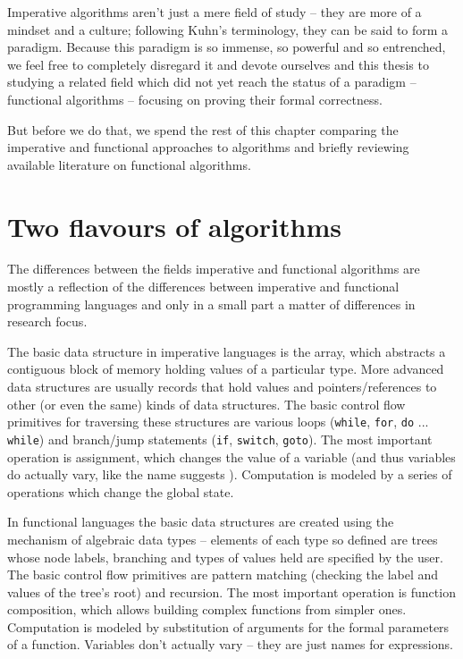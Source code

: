 \documentclass[declaration,mgr,english,shortabstract]{iithesis}
\newcommand{\m}[1]{\texttt{#1}}
\begin{document}
Imperative algorithms aren't just a mere field of study -- they are more of a mindset and a culture; following Kuhn's \cite{Kuhn} terminology, they can be said to form a paradigm. Because this paradigm is so immense, so powerful and so entrenched, we feel free to completely disregard it and devote ourselves and this thesis to studying a related field which did not yet reach the status of a paradigm -- functional algorithms -- focusing on proving their formal correctness.

But before we do that, we spend the rest of this chapter comparing the imperative and functional approaches to algorithms and briefly reviewing available literature on functional algorithms.

\section{Two flavours of algorithms} \label{ch1s2}

The differences between the fields imperative and functional algorithms are mostly a reflection of the differences between imperative and functional programming languages and only in a small part a matter of differences in research focus.

The basic data structure in imperative languages is the array, which abstracts a contiguous block of memory holding values of a particular type. More advanced data structures are usually records that hold values and pointers/references to other (or even the same) kinds of data structures. The basic control flow primitives for traversing these structures are various loops (\m{while}, \m{for}, \m{do} ... \m{while}) and branch/jump statements (\m{if}, \m{switch}, \m{goto}). The most important operation is assignment, which changes the value of a variable (and thus variables do actually vary, like the name suggests \cite{WordsMatter}). Computation is modeled by a series of operations which change the global state.

In functional languages the basic data structures are created using the mechanism of algebraic data types -- elements of each type so defined are trees whose node labels, branching and types of values held are specified by the user. The basic control flow primitives are pattern matching (checking the label and values of the tree's root) and recursion. The most important operation is function composition, which allows building complex functions from simpler ones. Computation is modeled by substitution of arguments for the formal parameters of a function. Variables don't actually vary -- they are just names for expressions. \cite{WordsMatter}
\end{document}
